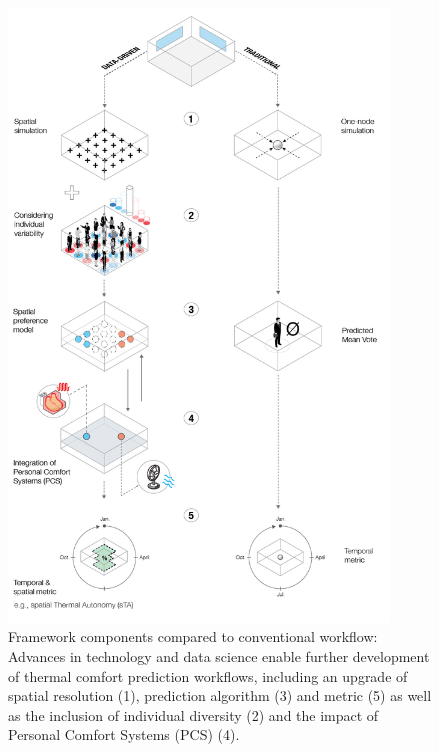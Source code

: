 \begin{figure}[H]
    \centering
    \includegraphics[width=0.9\textwidth]{manuscript/src/figures/workflow-comparison.png}
    \caption{Framework components compared to conventional workflow: Advances in technology and data science enable further development of thermal comfort prediction workflows, including an upgrade of spatial resolution (1), prediction algorithm (3) and metric (5) as well as the inclusion of individual diversity (2) and the impact of Personal Comfort Systems (PCS) (4).}
    \label{fig:framework}
\end{figure}






